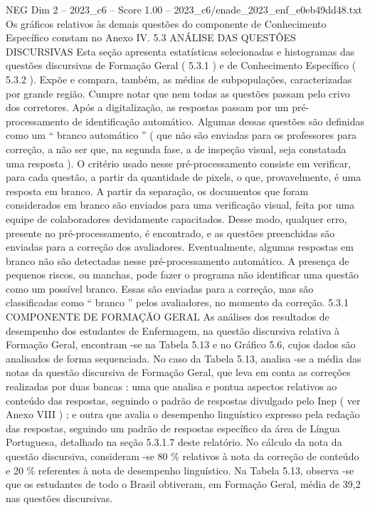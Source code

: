 \begin{textsample}{NEG Dim 2 – 2023\_c6 – Score 1.00 – 2023\_c6/enade\_2023\_enf\_e0eb49dd48.txt}
Os gráficos relativos às demais questões do componente de Conhecimento Específico constam no Anexo IV. 5.3 ANÁLISE DAS QUESTÕES DISCURSIVAS Esta seção apresenta estatísticas selecionadas e histogramas das questões discursivas de Formação Geral ( 5.3.1 ) e de Conhecimento Específico ( 5.3.2 ).
Expõe e compara, também, as médias de subpopulações, caracterizadas por grande região.
Cumpre notar que nem todas as questões passam pelo crivo dos corretores.
Após a digitalização, as respostas passam por um pré-processamento de identificação automático.
Algumas dessas questões são definidas como um “ branco automático ” ( que não são enviadas para os professores para correção, a não ser que, na segunda fase, a de inspeção visual, seja constatada uma resposta ).
O critério usado nesse pré-processamento consiste em verificar, para cada questão, a partir da quantidade de pixels, o que, provavelmente, é uma resposta em branco.
A partir da separação, os documentos que foram considerados em branco são enviados para uma verificação visual, feita por uma equipe de colaboradores devidamente capacitados.
Desse modo, qualquer erro, presente no pré-processamento, é encontrado, e as questões preenchidas são enviadas para a correção dos avaliadores.
Eventualmente, algumas respostas em branco não são detectadas nesse pré-processamento automático.
A presença de pequenos riscos, ou manchas, pode fazer o programa não identificar uma questão como um possível branco.
Essas são enviadas para a correção, mas são classificadas como “ branco ” pelos avaliadores, no momento da correção. 5.3.1 COMPONENTE DE FORMAÇÃO GERAL As análises dos resultados de desempenho dos estudantes de Enfermagem, na questão discursiva relativa à Formação Geral, encontram -se na Tabela 5.13 e no Gráfico 5.6, cujos dados são analisados de forma sequenciada.
No caso da Tabela 5.13, analisa -se a média das notas da questão discursiva de Formação Geral, que leva em conta as correções realizadas por duas bancas : uma que analisa e pontua aspectos relativos ao conteúdo das respostas, seguindo o padrão de respostas divulgado pelo Inep ( ver Anexo VIII ) ; e outra que avalia o desempenho linguístico expresso pela redação das respostas, seguindo um padrão de respostas específico da área de Língua Portuguesa, detalhado na seção 5.3.1.7 deste relatório.
No cálculo da nota da questão discursiva, consideram -se 80 \% relativos à nota da correção de conteúdo e 20 \% referentes à nota de desempenho linguístico.
Na Tabela 5.13, observa -se que os estudantes de todo o Brasil obtiveram, em Formação Geral, média de 39,2 nas questões discursivas.

\end{textsample}
